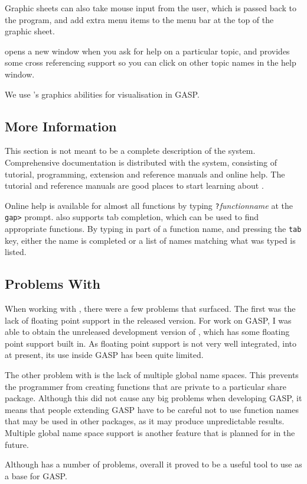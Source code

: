 Graphic sheets can also take mouse input from the user, which is
passed back to the program, and add extra menu items to the menu bar at
the top of the graphic sheet.

\XGAP{} opens a new window when you ask for help on a particular
topic, and provides some cross referencing support so you can click on
other topic names in the help window.

We use \XGAP{}'s graphics abilities for visualisation in GASP.


\subsection{More Information}

This section is not meant to be a complete description of the \GAP{}
system.  Comprehensive documentation is distributed with the \GAP{}
system, consisting of tutorial, programming, extension and reference
manuals and online help.  The tutorial \cite{gap-tut} and reference
\cite{gap-ref} manuals are good places to start learning about \GAP{}.

Online help is available for almost all \GAP{} functions by typing
\texttt{?}\textsl{function\-name} at the \texttt{gap>} prompt.  \GAP{} also
supports tab completion, which can be used to find appropriate
functions.  By typing in part of a function name, and pressing the
\texttt{tab} key, either the name is completed or a list of
names matching what was typed is listed.

\subsection{Problems With \GAP}

When working with \GAP{}, there were a few problems that surfaced.
The first was the lack of floating point support in the released
version.  For work on GASP, I was able to obtain the unreleased
development version of \GAP{}, which has some floating point support
built in.  As floating point support is not very well integrated, into
\GAP{} at present, its use inside GASP has been quite limited.

The other problem with \GAP{} is the lack of multiple global name
spaces.  This prevents the programmer from creating functions that are
private to a particular share package.  Although this did not cause
any big problems when developing GASP, it means that people extending
GASP have to be careful not to use function names that may be used in
other \GAP{} packages, as it may produce unpredictable results.
Multiple global name space support is another feature that is planned
for \GAP{} in the future.

Although \GAP{} has a number of problems, overall it proved to be a
useful tool to use as a base for GASP.